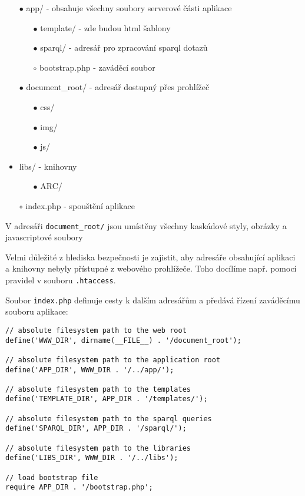 \begin{itemize}
\item[$\bullet$] app/ - obsahuje všechny soubory serverové části aplikace
    \begin{itemize}
    \item[$\bullet$] template/ - zde budou html šablony
    \item[$\bullet$] sparql/ - adresář pro zpracování sparql dotazů
    \item[$\circ$] bootstrap.php - zaváděcí soubor
    \end{itemize}
\item[$\bullet$] document\_root/ - adresář dostupný přes prohlížeč
    \begin{itemize}
    \item[$\bullet$] css/
    \item[$\bullet$] img/
    \item[$\bullet$] js/
    \end{itemize}
\item libs/ - knihovny
    \begin{itemize}
    \item[$\bullet$] ARC/
    \end{itemize}
\item[$\circ$] index.php - spouštění aplikace
\end{itemize}

V adresáři \verb|document_root/| jsou umístěny všechny kaskádové styly, obrázky a javascriptové soubory

Velmi důležité z hlediska bezpečnosti je zajistit, aby adresáře obsahující aplikaci a knihovny nebyly přístupné z webového prohlížeče.
Toho docílíme např. pomocí pravidel v souboru \verb|.htaccess|.

Soubor \verb|index.php| definuje cesty k dalším adresářům a předává řízení zaváděcímu souboru aplikace:

\begin{verbatim}
// absolute filesystem path to the web root
define('WWW_DIR', dirname(__FILE__) . '/document_root');

// absolute filesystem path to the application root
define('APP_DIR', WWW_DIR . '/../app/');

// absolute filesystem path to the templates 
define('TEMPLATE_DIR', APP_DIR . '/templates/');

// absolute filesystem path to the sparql queries
define('SPARQL_DIR', APP_DIR . '/sparql/');

// absolute filesystem path to the libraries
define('LIBS_DIR', WWW_DIR . '/../libs');

// load bootstrap file
require APP_DIR . '/bootstrap.php';
\end{verbatim}

